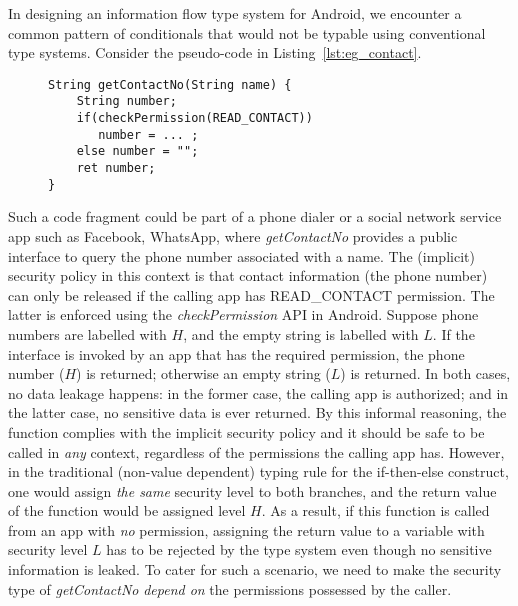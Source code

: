 In designing an information flow type system for Android, we encounter
a common pattern of conditionals that would not be typable using conventional type systems.
Consider the pseudo-code in Listing~\ref{lst:eg_contact}.
\begin{figure}[ht]
\begin{lstlisting}[caption={Sample code for getting contact info with a permission check.}, label={lst:eg_contact}]
String getContactNo(String name) {
    String number;
    if(checkPermission(READ_CONTACT))
       number = ... ;
    else number = "";
    ret number;
}
\end{lstlisting}
\end{figure}
Such a code fragment could be part of a phone dialer or a social network service app such as Facebook, WhatsApp, where \textit{getContactNo} provides
a public interface to query the phone number associated with a name. The (implicit) security policy in this
context is that contact information (the phone number) can only be released if the calling app has
READ\_CONTACT permission.
The latter is enforced using the \textit{checkPermission} API in Android.
Suppose phone numbers are labelled with $H$, and the empty string is labelled with $L$.
If the interface is invoked by an app that has the required permission,
the phone number ($H$) is returned; otherwise an empty string ($L$)
is returned. In both cases, no data leakage happens: in the former case, the calling app is authorized; and in the latter case, no sensitive data is ever returned. By this informal reasoning, the function complies with the implicit security policy and it
should be safe to be called in \emph{any} context, regardless of the permissions the calling app has.
However, in the traditional (non-value dependent) typing rule for the if-then-else construct, one would assign \emph{the same} security level to both branches,
and the return value of the function would be assigned level $H$.
As a result, if this function is called from an app with \emph{no} permission, assigning the return value to a variable with security level $L$ has to be rejected by the type system even though no sensitive information is leaked.
To cater for such a scenario, we need to make the security type of \textit{getContactNo}
 \emph{depend on} the permissions possessed by the caller.

